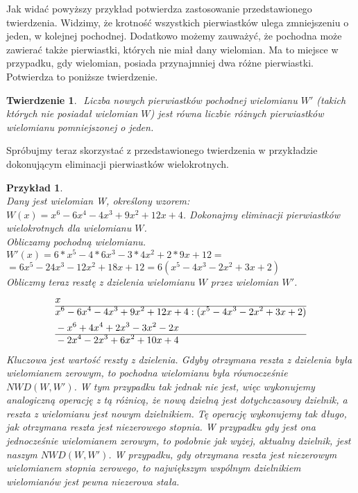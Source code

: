 \documentclass[twoside,a4paper]{book}
\newtheorem{theorem}{Twierdzenie}
\newtheorem{example}{Przykład}
\begin{document}
Jak widać powyższy przykład potwierdza zastosowanie przedstawionego twierdzenia. Widzimy, że krotność wszystkich pierwiastków ulega zmniejszeniu o jeden, w kolejnej pochodnej. Dodatkowo możemy zauważyć, że pochodna może zawierać także pierwiastki, których nie miał dany wielomian. Ma to miejsce w przypadku, gdy wielomian, posiada przynajmniej dwa różne pierwiastki. Potwierdza to poniższe twierdzenie.

\begin{theorem}
	$ $
	Liczba nowych pierwiastków pochodnej wielomianu $W'$ (takich których nie posiadał wielomian $W$) jest równa liczbie różnych pierwiastków wielomianu pomniejszonej o jeden.
\end{theorem}

Spróbujmy teraz skorzystać z przedstawionego twierdzenia w przykładzie dokonującym eliminacji pierwiastków wielokrotnych.

\begin{example}
	$ $ \\
	Dany jest wielomian W, określony wzorem: $W(x)=x^6-6x^4-4x^3+9x^2+12x+4$. Dokonajmy eliminacji pierwiastków wielokrotnych dla wielomianu $W$. \\
	Obliczamy pochodną wielomianu. \\
	$W'(x)=6*x^5-4*6x^3-3*4x^2+2*9x+12=$ \\
	$=6x^5-24x^3-12x^2+18x+12=6(x^5-4x^3-2x^2+3x+2)$ \\
	Obliczmy teraz resztę z dzielenia wielomianu $W$ przez wielomian $W'$.
	\begin{equation}
	\begin{split}
		&x\\\hline
		&x^6-6x^4-4x^3+9x^2+12x+4 : (x^5-4x^3-2x^2+3x+2) \\
		&-x^6+4x^4+2x^3-3x^2-2x \\\hline
		&-2x^4-2x^3+6x^2+10x+4 \\
	\end{split}
	\end{equation}
	Kluczowa jest wartość reszty z dzielenia. Gdyby otrzymana reszta z dzielenia była wielomianem zerowym, to pochodna wielomianu była równocześnie $NWD(W, W')$. W tym przypadku tak jednak nie jest, więc wykonujemy analogiczną operację z tą różnicą, że nową dzielną jest dotychczasowy dzielnik, a reszta z wielomianu jest nowym dzielnikiem. Tę operację wykonujemy tak długo, jak otrzymana reszta jest niezerowego stopnia. W przypadku gdy jest ona jednocześnie wielomianem zerowym, to podobnie jak wyżej, aktualny dzielnik, jest naszym $NWD(W, W')$. W przypadku, gdy otrzymana reszta jest niezerowym wielomianem stopnia zerowego, to największym wspólnym dzielnikiem wielomianów jest pewna niezerowa stała.
\end{example}
\end{document}
